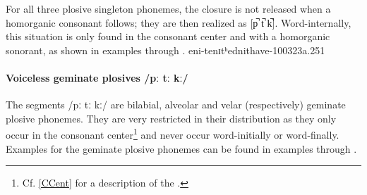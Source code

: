 For all three plosive singleton phonemes, the closure is not released when a homorganic consonant %
follows; they are then realized as [p̚ t̚ k̚]. Word-internally, this situation is only found in the consonant center and with a homorganic sonorant, as shown in examples  through . 
{eni-t}{enɪtʰ}{ednit}{have-}{100323a}{.251}


\paragraph{Voiceless geminate plosives /pː tː kː/}
The segments /pː tː kː/ are bilabial, alveolar and velar (respectively) geminate plosive phonemes. They are very restricted in their distribution as they only occur in the consonant center\footnote{Cf. \ref{CCent} for a description of the .} %
and never occur word-initially or word-finally. %
Examples for the geminate plosive phonemes can be found in examples  through .

